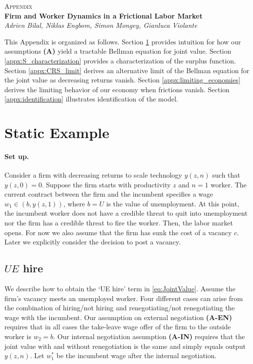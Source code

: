 \appendix
\renewcommand\thefigure{\thesection.\arabic{figure}}
\setcounter{figure}{0}
\begin{center}
\textsc{\huge Appendix}\vspace*{.5cm} \\
\textbf{\Large Firm and Worker Dynamics in a Frictional Labor Market}\vspace*{.5cm} \\
\emph{\Large Adrien Bilal, Niklas Engbom, Simon Mongey, Gianluca Violante}\vspace*{.5cm} \\
\end{center}

\noindent This Appendix is organized as follows.
Section \ref{appx:staticexample} provides intuition for how our assumptions \textbf{(A)} yield a tractable Bellman equation for joint value.
Section \ref{appx:S_characterization} provides a characterization of the surplus function.
Section \ref{appx:CRS_limit} derives an alternative limit of the Bellman equation for the joint value as decreasing returns vanish.
Section \ref{appx:limiting_economies} derives the limiting behavior of our economy when frictions vanish.
Section \ref{appx:identification} illustrates identification of the model.

\section{Static Example}
\label{appx:staticexample}

\paragraph{Set up.}
Consider a firm with decreasing returns to scale technology $y(z,n)$ such that $y(z,0) = 0$. Suppose the firm starts with productivity $z$ and $n=1$ worker. The current contract between the firm and the incumbent specifies a wage $w_{1}\in (b,y(z,1))$, where $b=U$ is the value of unemployment.
At this point, the incumbent worker does not have a credible threat to quit into unemployment nor the firm has a credible threat to fire the worker. Then, the labor market opens. For now we also assume that the firm has sunk the cost of a vacancy $c$. Later we explicitly consider the decision to post a vacancy.

\subsection{$UE$ hire}
\label{appx:UE_hire}
We describe how to obtain the `UE hire' term  in \eqref{eq:JointValue}.
Assume the firm's vacancy meets an unemployed worker.
Four different cases can arise from the combination of hiring/not hiring and renegotiating/not renegotiating the wage with the incumbent.
Our assumption on external negotiation \textbf{(A-EN)} requires that in all cases the take-leave wage offer of the firm to the outside worker is $w_{2}=b$. Our internal negotiation assumption \textbf{(A-IN)} requires that the joint value with and without renegotiation is the same and simply equals output $y(z,n)$. Let $w_{1}^{\ast }$ be the incumbent wage after the internal negotiation.

